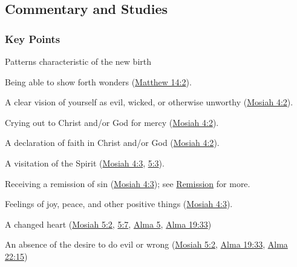 	
	
	
\subsection{Commentary and Studies} %
	\label{NEWBIRTH-COMMENTARY}

	\subsubsection{Key Points}
		\label{NEWBIRTH-KEYS}
	
		\begin{compactitem}
			\item Patterns characteristic of the new birth
				\begin{compactitem}
					\item Being able to show forth wonders (\hyperref[MATTHEW-14-2]{Matthew 14:2}).
					\item A clear vision of yourself as evil, wicked, or otherwise unworthy (\hyperref[MOSIAH-4-2]{Mosiah 4:2}).
					\item Crying out to Christ and/or God for mercy (\hyperref[MOSIAH-4-2]{Mosiah 4:2}).
					\item A declaration of faith in Christ and/or God (\hyperref[MOSIAH-4-2]{Mosiah 4:2}).
					\item A visitation of the Spirit (\hyperref[MOSIAH-4-3]{Mosiah 4:3}, \hyperref[MOSIAH-5-3]{5:3}).
					\item Receiving a remission of sin (\hyperref[MOSIAH-4-3]{Mosiah 4:3}); see \hyperref[REMISSION]{Remission} for more.
					\item Feelings of joy, peace, and other positive things (\hyperref[MOSIAH-4-3]{Mosiah 4:3}).
					\item A changed heart (\hyperref[MOSIAH-5-2]{Mosiah 5:2}, \hyperref[MOSIAH-5-7]{5:7}, \hyperref[ALMA-5]{Alma 5}, \hyperref[ALMA-19-33]{Alma 19:33})
					\item An absence of the desire to do evil or wrong (\hyperref[MOSIAH-5-2]{Mosiah 5:2}, \hyperref[ALMA-19-33]{Alma 19:33}, \hyperref[ALMA-22-15]{Alma 22:15})
				\end{compactitem}
		\end{compactitem}
		
